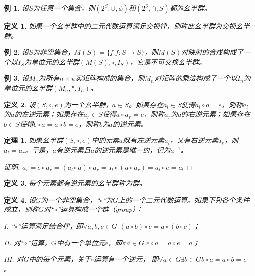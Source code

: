 \documentclass{article}
\newtheorem{Def}{定义}
\newtheorem{Thm}{定理}
\newtheorem*{Example}{例}
\begin{document}
\begin{CJK*}{UTF8}{gbsn}
\begin{Example}
  设$S$为任意一个集合，则$(2^S,\cup,\phi)$和$(2^S,\cap,S)$都为幺半群。
\end{Example}

\begin{Def}
  如果一个幺半群中的二元代数运算满足交换律，则称此幺半群为交换幺半群。
\end{Def}

\begin{Example}
  设$S$为非空集合，$M(S)=\{f|f:S\to S\}$，则$M(S)$对映射的合成构成了一个以$I_S$为单位元的幺半群$(M(S),\circ,I_S)$，它是不可交换幺半群。
\end{Example}
\begin{Example}
  设$M_n$为所有$n\times n$实矩阵构成的集合，则$M_n$对矩阵的乘法构成了一个以$I_n$为单位元的幺半群$(M_n,*,I_n)$。
\end{Example}


\begin{Def}
  设$(S,\circ,e)$为一个幺半群，$a\in S$。如果存在$a_l\in S$使得$a_l\circ a=e$，则称$a_l$为$a$的左逆元素；如果存在$a_r
  \in S$使得$a\circ a_r=e$，则称$a_r$为$a$的右逆元素；如果存在$b\in S$使得$b\circ a=a\circ b=e$，则称$b$为$a$的逆元素。
\end{Def}
\begin{Thm}
  如果幺半群$(S,\circ,e)$中的元素$a$既有左逆元素$a_l$，又有右逆元素$a_r$，则$a_l=a_r$。于是，$a$有逆元素且$a$的逆元素是唯一的，记为$a^{-1}$。
\end{Thm}
\begin{proof}[证明]
  $a_r=e\circ a_r=(a_l\circ a)\circ a_r=a_l\circ(a\circ a_r)=a_l\circ e=a_l$
\end{proof}
\begin{Def}
  每个元素都有逆元素的幺半群称为群。
\end{Def}

\begin{Def}
  设$G$为一个非空集合，“$\circ$”为$G$上的一个二元代数运算。如果下列各个条件成立，则称$G$对“$\circ$”运算构成一个群（group）：

  I. “$\circ$”运算满足结合律，即$\forall a,b,c \in G$ $(a\circ b)\circ c = a\circ(b\circ c)$；

  II. 对“$\circ$”运算，$G$中有一个单位元$e$，即$\forall a\in G$ $e\circ a =a\circ e= a$；

  III. 对$G$中的每个元素，关于$\circ$运算有一个逆元，
  即$\forall a\in G \exists b\in G b\circ a = a\circ b= e$。
\end{Def}


\end{CJK*}
\end{document}
